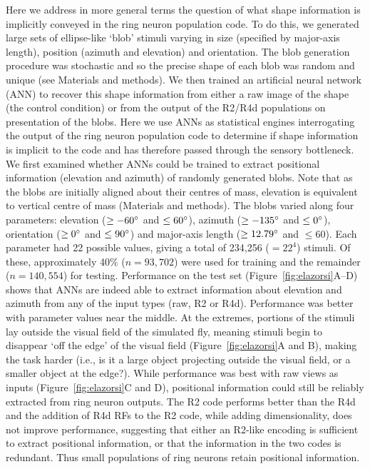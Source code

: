 Here we address in more general terms the question of what shape information is implicitly conveyed in the ring neuron population code. To do this, we generated large sets of ellipse-like ‘blob’ stimuli varying in size (specified by major-axis length), position (azimuth and elevation) and orientation. The blob generation procedure was stochastic and so the precise shape of each blob was random and unique (see Materials and methods). We then trained an artificial neural network (ANN) to recover this shape information from either a raw image of the shape (the control condition) or from the output of the R2/R4d populations on presentation of the blobs. Here we use ANNs as statistical engines interrogating the output of the ring neuron population code to determine if shape information is implicit to the code and has therefore passed through the sensory bottleneck. We first examined whether ANNs could be trained to extract positional information (elevation and azimuth) of randomly generated blobs. Note that as the blobs are initially aligned about their centres of mass, elevation is equivalent to vertical centre of mass (Materials and methods). The blobs varied along four parameters: elevation ($\ge -60\degree$ and $\le 60\degree$), azimuth ($\ge -135\degree$ and $\le 0\degree$), orientation ($\ge 0\degree$ and $\le 90\degree$) and major-axis length ($\ge 12.79\degree$ and $\le 60$). Each parameter had 22 possible values, giving a total of 234,256 ($=22^4$) stimuli. Of these, approximately 40\% ($n=93,702$) were used for training and the remainder ($n=140,554$) for testing. Performance on the test set (Figure~\ref{fig:elazorsi}A--D) shows that ANNs are indeed able to extract information about elevation and azimuth from any of the input types (raw, R2 or R4d). Performance was better with parameter values near the middle. At the extremes, portions of the stimuli lay outside the visual field of the simulated fly, meaning stimuli begin to disappear ‘off the edge’ of the visual field (Figure~\ref{fig:elazorsi}A and B), making the task harder (i.e., is it a large object projecting outside the visual field, or a smaller object at the edge?). While performance was best with raw views as inputs (Figure~\ref{fig:elazorsi}C and D), positional information could still be reliably extracted from ring neuron outputs. The R2 code performs better than the R4d and the addition of R4d \acp{RF} to the R2 code, while adding dimensionality, does not improve performance, suggesting that either an R2-like encoding is sufficient to extract positional information, or that the information in the two codes is redundant. Thus small populations of ring neurons retain positional information.

